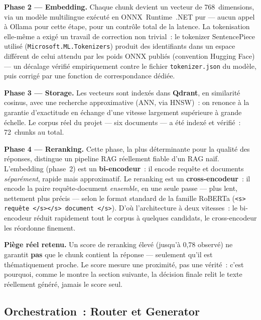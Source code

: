 \documentclass[12pt,a4paper]{article}
\newcommand{\code}[1]{\texttt{\small #1}}
\begin{document}
\textbf{Phase 2 --- Embedding.} Chaque chunk devient un vecteur de 768~dimensions, via un mod\`ele multilingue ex\'ecut\'e en ONNX~Runtime~.NET pur --- aucun appel \`a Ollama pour cette \'etape, pour un contr\^ole total de la latence. La tokenisation elle-m\^eme a exig\'e un travail de correction non trivial~: le tokenizer SentencePiece utilis\'e (\code{Microsoft.ML.Tokenizers}) produit des identifiants dans un espace diff\'erent de celui attendu par les poids ONNX publi\'es (convention Hugging Face) --- un d\'ecalage v\'erifi\'e empiriquement contre le fichier \code{tokenizer.json} du mod\`ele, puis corrig\'e par une fonction de correspondance d\'edi\'ee.

\textbf{Phase 3 --- Storage.} Les vecteurs sont index\'es dans \textbf{Qdrant}, en similarit\'e cosinus, avec une recherche approximative (ANN, via HNSW)~: on renonce \`a la garantie d'exactitude en \'echange d'une vitesse largement sup\'erieure \`a grande \'echelle. Le corpus r\'eel du projet --- six documents --- a \'et\'e index\'e et v\'erifi\'e~: 72~chunks au total.

\textbf{Phase 4 --- Reranking.} Cette phase, la plus d\'eterminante pour la qualit\'e des r\'eponses, distingue un pipeline RAG r\'eellement fiable d'un RAG na\"if. L'embedding (phase~2) est un \textbf{bi-encodeur}~: il encode requ\^ete et documents \textit{s\'epar\'ement}, rapide mais approximatif. Le reranking est un \textbf{cross-encodeur}~: il encode la paire requ\^ete-document \textit{ensemble}, en une seule passe --- plus lent, nettement plus pr\'ecis --- selon le format standard de la famille RoBERTa (\code{<s> requ\^ete </s></s> document </s>}). D'o\`u l'architecture \`a deux vitesses~: le bi-encodeur r\'eduit rapidement tout le corpus \`a quelques candidats, le cross-encodeur les r\'eordonne finement.

\textbf{Pi\`ege r\'eel retenu.} Un score de reranking \'elev\'e (jusqu'\`a 0,78 observ\'e) ne garantit \textbf{pas} que le chunk contient la r\'eponse --- seulement qu'il est th\'ematiquement proche. Le score mesure une proximit\'e, pas une v\'erit\'e~: c'est pourquoi, comme le montre la section suivante, la d\'ecision finale relit le texte r\'eellement g\'en\'er\'e, jamais le score seul.

\subsection{Orchestration~: Router et Generator}
\end{document}
